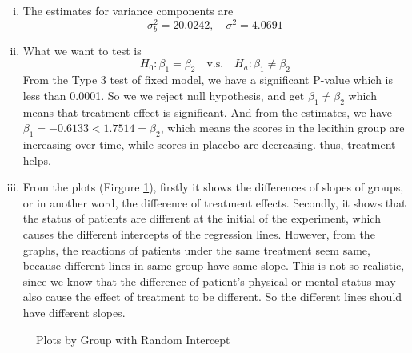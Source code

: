 \documentclass[letterpaper, 12pt]{article}
\begin{document}
\begin{enumerate}[i.]
\item The estimates for variance components are
$$
\sigma_{b}^2=20.0242,\quad \sigma^2=4.0691
$$

\item What we want to test is
$$
H_0:\beta_1=\beta_2\quad\text{v.s.}\quad H_a: \beta_1\not=\beta_2
$$
From the Type 3 test of fixed model, we have a significant P-value which is less than 0.0001. So we we reject null hypothesis, and get $\beta_1\not=\beta_2$ which means that treatment effect is significant. And from the estimates, we have $\beta_1=-0.6133<1.7514=\beta_2$, which means the scores in the lecithin group are increasing over time, while scores in placebo are decreasing. thus, treatment helps.

\item From the plots (Firgure \ref{plot2}), firstly it shows the differences of slopes of groups, or in another word, the difference of treatment effects. Secondly, it shows that the status of patients are different at the initial of the experiment, which causes the different intercepts of the regression lines. However, from the graphs, the reactions of patients under the same treatment seem same, because different lines in same group have same slope. This is not so realistic, since we know that the difference of patient's physical or mental status may also cause the effect of treatment to be different. So the different lines should have different slopes.
\end{enumerate}
\begin{figure}[htbp]
	\caption{Plots by Group with Random Intercept}
	\label{plot2}
	\centering
\end{figure}
\end{document}
